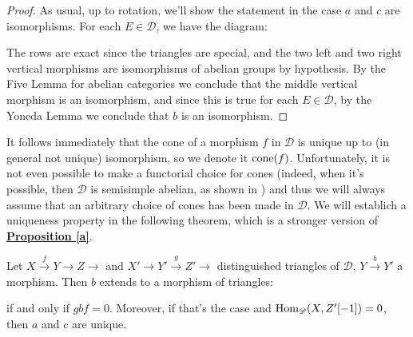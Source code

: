 \begin{proof}
As usual, up to rotation, we'll show the statement in the case $a$ and $c$ are isomorphisms. For each $E \in \mathscr{D}$, we have the diagram: 
\begin{center}
\end{center}
The rows are exact since the triangles are special, and the two left and two right vertical morphisms are isomorphisms of abelian groups by hypothesis. By the Five Lemma for abelian categories we conclude that the middle vertical morphism is an isomorphism, and since this is true for each $E \in \mathscr{D}$, by the Yoneda Lemma we conclude that $b$ is an isomorphism. 
\end{proof}
 
It follows immediately that the cone of a morphism $f$ in $\mathscr{D}$ is unique up to (in general not unique) isomorphism, so we denote it $\textnormal{cone}(f)$. Unfortunately, it is not even possible to make a functorial choice for cones (indeed, when it's possible, then $\mathscr{D}$ is semisimple abelian, as shown in \cite{ver}) and thus we will always assume that an arbitrary choice of cones has been made in $\mathscr{D}$. We will establich a uniqueness property in the following theorem, which is a stronger version of \hyperref[a]{\textbf{Proposition \ref*{a}}}.\\

\begin{prop}\label{g}
Let $X \overset{f}{\longrightarrow} Y \longrightarrow Z \longrightarrow$ and $X' \longrightarrow Y' \overset{g}{\longrightarrow} Z' \longrightarrow$ distinguished triangles of $\mathscr{D}$, $Y \overset{b}{\longrightarrow} Y'$ a morphism. Then $b$ extends to a morphism of triangles: 
\begin{center}
\end{center}
if and only if $gbf=0$. Moreover, if that's the case and $\textnormal{Hom}_{\mathscr{D}}(X,Z'[-1])=0$, then $a$ and $c$ are unique. 
\end{prop}

